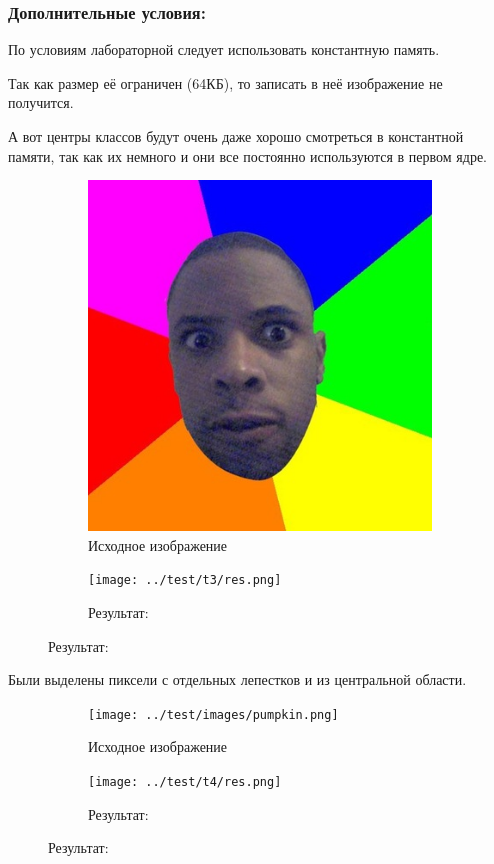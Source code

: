 \documentclass[12pt]{article}
\begin{document}
\subsubsection*{Дополнительные условия:}

По условиям лабораторной следует использовать константную память.

Так как размер её ограничен (64КБ), то записать в неё изображение не получится.

А вот центры классов будут очень даже хорошо смотреться в константной памяти,
так как их немного и они все постоянно используются в первом ядре.

{
}

\newpage


\begin{figure}[!tbh]
	\caption*{Малое изображение: 400x408}
	\begin{subfigure}{0.49\textwidth}
		\centering
		\caption*{Исходное изображение}
		\includegraphics[scale=0.4]{../test/images/nigger.png}
	\end{subfigure}
	\begin{subfigure}{0.49\textwidth}
		\centering
		\caption*{Результат:}
		\texttt{[image: ../test/t3/res.png]}
	\end{subfigure}
\end{figure}

Были выделены пиксели с отдельных лепестков и из центральной области.

\begin{figure}[!tbh]
	\caption*{Большое изображение: 6000x4000}
	\begin{subfigure}{0.49\textwidth}
		\centering
		\caption*{Исходное изображение}
		\texttt{[image: ../test/images/pumpkin.png]}
	\end{subfigure}
	\begin{subfigure}{0.49\textwidth}
		\centering
		\caption*{Результат:}
		\texttt{[image: ../test/t4/res.png]}
	\end{subfigure}
\end{figure}
\end{document}
